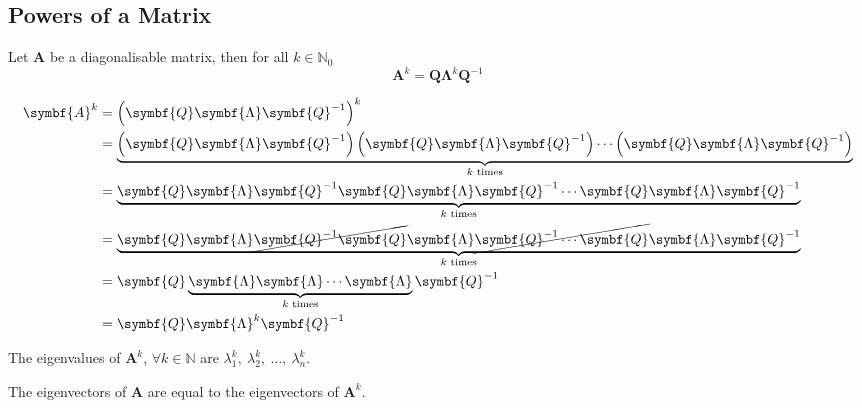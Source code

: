 \documentclass{article}
\begin{document}
\subsection{Powers of a Matrix}
\begin{theorem}
    Let \(\symbf{A}\) be a diagonalisable matrix, then for all
    \(k \in \mathbb{N}_0\)
    \begin{equation*}
        \symbf{A}^k = \symbf{Q} \symbf{\Lambda}^k \symbf{Q}^{-1}
    \end{equation*}
\end{theorem}
\begin{solutionF}[Proof]
    \begin{align*}
        \symbf{A}^k & = \left( \symbf{Q} \symbf{\Lambda} \symbf{Q}^{-1} \right)^k                                                                                                                                                                 \\
                      & = \underbrace{\left( \symbf{Q} \symbf{\Lambda} \symbf{Q}^{-1} \right)\left( \symbf{Q} \symbf{\Lambda} \symbf{Q}^{-1} \right)\cdots\left( \symbf{Q} \symbf{\Lambda} \symbf{Q}^{-1} \right)}_{\text{\(k\) times}} \\
                      & = \underbrace{\symbf{Q} \symbf{\Lambda} \symbf{Q}^{-1} \symbf{Q} \symbf{\Lambda} \symbf{Q}^{-1} \cdots \symbf{Q} \symbf{\Lambda} \symbf{Q}^{-1} }_{\text{\(k\) times}}                                          \\
                      & = \underbrace{\symbf{Q} \symbf{\Lambda} \cancel{\symbf{Q}^{-1} \symbf{Q}} \symbf{\Lambda} \cancel{\symbf{Q}^{-1} \cdots \symbf{Q}} \symbf{\Lambda} \symbf{Q}^{-1} }_{\text{\(k\) times}}                        \\
                      & = \symbf{Q} \underbrace{ \symbf{\Lambda} \symbf{\Lambda} \cdots \symbf{\Lambda} }_{\text{\(k\) times}}\symbf{Q}^{-1}                                                                                                    \\
                      & = \symbf{Q} \symbf{\Lambda}^k\symbf{Q}^{-1}
    \end{align*}
\end{solutionF}
\begin{theorem}
    The eigenvalues of \(\symbf{A}^k\), \(\forall k \in \mathbb{N}\)
    are \(\lambda_1^k,\: \lambda_2^k,\: \dots,\: \lambda_n^k\).
\end{theorem}
\begin{theorem}
    The eigenvectors of \(\symbf{A}\) are equal to the eigenvectors of
    \(\symbf{A}^k\).
\end{theorem}
\newpage
\end{document}
